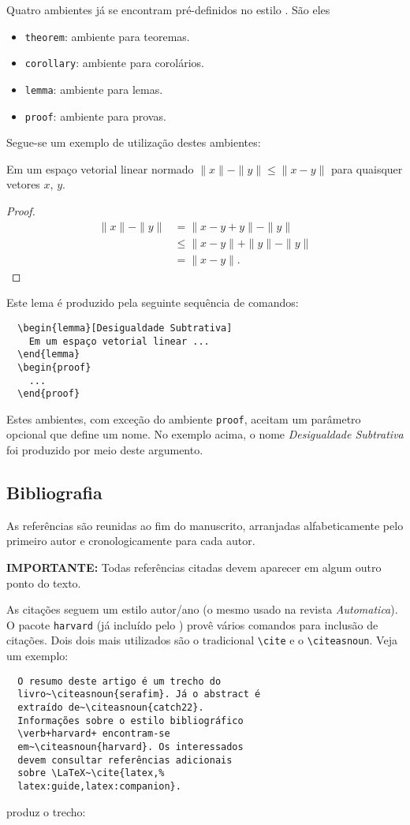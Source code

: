 \documentclass[conference,harvard,brazil,english]{sbatex}
\begin{document}
Quatro ambientes já se encontram pré-definidos no estilo \SBATeX. São
eles
\begin{itemize}
\item \verb+theorem+: ambiente para teoremas.
\item \verb+corollary+: ambiente para corolários.
\item \verb+lemma+: ambiente para lemas.
\item \verb+proof+: ambiente para provas.
\end{itemize}
Segue-se um exemplo de utilização destes ambientes:
\begin{lemma}
Em um espaço vetorial linear normado $\|x\| - \|y\| \leq \|x - y\|$
para quaisquer vetores $x$, $y$.
\end{lemma}
\begin{proof}
\begin{align*}
\|x\| - \|y\| &= \|x - y + y\| - \|y\| \ \\
              &\leq \|x - y \| + \|y\| - \|y\| \\
              &= \|x - y\|.
\end{align*}
\end{proof}
Este lema é produzido pela seguinte sequência de comandos:
\begin{verbatim}
  \begin{lemma}[Desigualdade Subtrativa]
    Em um espaço vetorial linear ...
  \end{lemma}
  \begin{proof}
    ...
  \end{proof}
\end{verbatim}

Estes ambientes, com exceção do ambiente \verb+proof+, aceitam
um parâmetro opcional que define um nome. No exemplo acima, o nome
\emph{Desigualdade Subtrativa} foi produzido por meio deste argumento.


\subsection{Bibliografia}
\label{sec:bibliografia}

As referências são reunidas ao fim do manuscrito, arranjadas
alfabeticamente pelo primeiro autor e cronologicamente para cada
autor.

\textbf{IMPORTANTE:} Todas referências citadas devem aparecer em algum
outro ponto do texto.

As citações seguem um estilo autor/ano (o mesmo
usado na revista {\em Automatica}). O pacote \verb+harvard+ (já
incluído pelo \SBATeX) provê vários comandos para inclusão de
citações. Dois dois mais utilizados são o tradicional \verb+\cite+ e o
\verb+\citeasnoun+. Veja um exemplo:
\begin{verbatim}
  O resumo deste artigo é um trecho do
  livro~\citeasnoun{serafim}. Já o abstract é
  extraído de~\citeasnoun{catch22}.
  Informações sobre o estilo bibliográfico
  \verb+harvard+ encontram-se
  em~\citeasnoun{harvard}. Os interessados
  devem consultar referências adicionais
  sobre \LaTeX~\cite{latex,%
  latex:guide,latex:companion}.
\end{verbatim}
produz o trecho:
\end{document}

